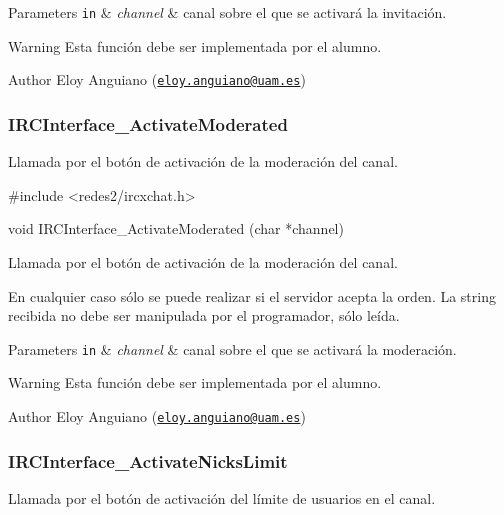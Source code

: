 \begin{DoxyParams}[1]{Parameters}
\mbox{\tt in}  & {\em channel} & canal sobre el que se activará la invitación.\\
\hline
\end{DoxyParams}
\begin{DoxyWarning}{Warning}
Esta función debe ser implementada por el alumno.
\end{DoxyWarning}
\begin{DoxyAuthor}{Author}
Eloy Anguiano (\href{mailto:eloy.anguiano@uam.es}{\tt eloy.\+anguiano@uam.\+es})
\end{DoxyAuthor}


 \hypertarget{IRCInterface_ActivateModerated}{}\subsubsection{I\+R\+C\+Interface\+\_\+\+Activate\+Moderated}\label{IRCInterface_ActivateModerated}
Llamada por el botón de activación de la moderación del canal.


\begin{DoxyCode}
\textcolor{preprocessor}{#include <redes2/ircxchat.h>}

\textcolor{keywordtype}{void} IRCInterface\_ActivateModerated (\textcolor{keywordtype}{char} *channel)
\end{DoxyCode}


Llamada por el botón de activación de la moderación del canal.

En cualquier caso sólo se puede realizar si el servidor acepta la orden. La string recibida no debe ser manipulada por el programador, sólo leída.


\begin{DoxyParams}[1]{Parameters}
\mbox{\tt in}  & {\em channel} & canal sobre el que se activará la moderación.\\
\hline
\end{DoxyParams}
\begin{DoxyWarning}{Warning}
Esta función debe ser implementada por el alumno.
\end{DoxyWarning}
\begin{DoxyAuthor}{Author}
Eloy Anguiano (\href{mailto:eloy.anguiano@uam.es}{\tt eloy.\+anguiano@uam.\+es})
\end{DoxyAuthor}


 \hypertarget{IRCInterface_ActivateNicksLimit}{}\subsubsection{I\+R\+C\+Interface\+\_\+\+Activate\+Nicks\+Limit}\label{IRCInterface_ActivateNicksLimit}
Llamada por el botón de activación del límite de usuarios en el canal.



